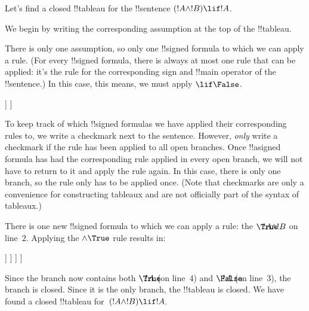 \documentclass[../../../include/open-logic-section]{subfiles}
\begin{document}
      {}
      {}


\begin{ex}
Let's find a closed !!{tableau} for the !!{sentence} $(!A \land !B) \lif !A$.

We begin by writing the corresponding assumption at the top of the
!!{tableau}.
\begin{oltableau}
  [\sFmla{\False}{(\formula{A} \land \formula{B}) \lif \formula{A}},
    just = \TAss]
\end{oltableau}

There is only one assumption, so only one !!{signed formula} to which
we can apply a rule. (For every !!{signed formula}, there is always at
most one rule that can be applied: it's the rule for the corresponding
sign and !!{main operator} of the !!{sentence}.) In this case, this
means, we must apply $\TRule{\False}{\lif}$.
\begin{oltableau}
  [\sFmla{\False}{(\formula{A} \land \formula{B}) \lif \formula{A}},
    checked, just = \TAss
    [\sFmla{\True}{\formula{A} \land \formula{B}},
      just={\TRule{\False}{\lif}[1]}
      [\sFmla{\False}{\formula{A}}, just={\TRule{\False}{\lif}[1]}]
    ]
  ]
\end{oltableau}
To keep track of which !!{signed formula}s we have applied their
corresponding rules to, we write a checkmark next to the
sentence. However, \emph{only} write a checkmark if the rule has been
applied to all open branches. Once !!a{signed formula} has had the
corresponding rule applied in every open branch, we will not have to
return to it and apply the rule again. In this case, there is only one
branch, so the rule only has to be applied once. (Note that checkmarks
are only a convenience for constructing tableaux and are not
officially part of the syntax of tableaux.)

There is one new !!{signed formula} to which we can apply a rule: the
$\sFmla{\True}{!A \land !B}$ on line~$2$. Applying the
$\TRule{\True}{\land}$ rule results in:
\begin{oltableau}
  [\sFmla{\False}{(\formula{A} \land \formula{B}) \lif \formula{A}},
    checked, just = \TAss
    [\sFmla{\True}{\formula{A} \land \formula{B}},
      just={\TRule{\False}{\lif}[1]}, checked
      [\sFmla{\False}{\formula{A}}, just={\TRule{\False}{\lif}[1]}
        [\sFmla{\True}{\formula{A}}, just={\TRule{\True}{\land}[2]}
          [\sFmla{\True}{\formula{B}}, just={\TRule{\True}{\land}[2]}, close
          ]
        ]
      ]
    ]
  ]
\end{oltableau}
Since the branch now contains both $\sFmla{\True}{!A}$ (on line~$4$)
and $\sFmla{\False}{!A}$ (on line~$3$), the branch is closed. Since it
is the only branch, the !!{tableau} is closed. We have found
a closed !!{tableau} for~$(!A \land !B) \lif !A$.
\end{ex}
\end{document}
